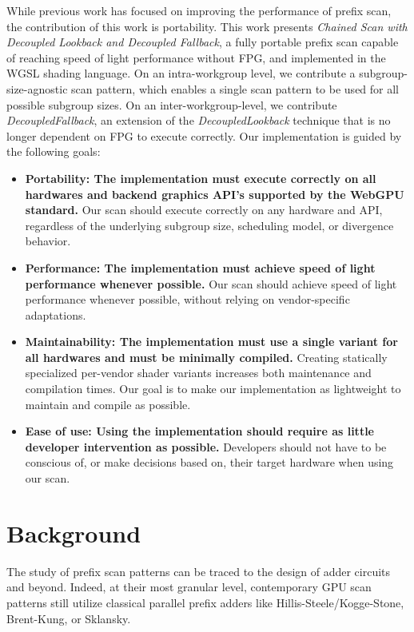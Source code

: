 \documentclass[sigconf]{acmart}
\begin{document}
While previous work has focused on improving the performance of prefix scan, the contribution of this work is portability. This work presents \textit{Chained Scan with Decoupled Lookback and Decoupled Fallback}, a fully portable prefix scan capable of reaching speed of light performance without FPG, and implemented in the WGSL shading language. On an intra-workgroup level, we contribute a subgroup-size-agnostic scan pattern, which enables a single scan pattern to be used for all possible subgroup sizes. On an inter-workgroup-level, we contribute \textit{DecoupledFallback}, an extension of the \textit{DecoupledLookback} technique that is no longer dependent on FPG to execute correctly. Our implementation is guided by the following goals:
\begin{itemize}
\item \textbf{Portability: The implementation must execute correctly on all hardwares and backend graphics API's supported by the WebGPU standard.} Our scan should execute correctly on any hardware and API, regardless of the underlying subgroup size, scheduling model, or divergence behavior. 
\item \textbf{Performance: The implementation must achieve speed of light performance whenever possible.} Our scan should achieve speed of light performance whenever possible, without relying on vendor-specific adaptations.
\item \textbf{Maintainability: The implementation must use a single variant for all hardwares and must be minimally compiled.} Creating statically specialized per-vendor shader variants increases both maintenance and compilation times. Our goal is to make our implementation as lightweight to maintain and compile as possible.
\item \textbf{Ease of use: Using the implementation should require as little developer intervention as possible.} Developers should not have to be conscious of, or make decisions based on, their target hardware when using our scan.
\end{itemize}

\section{Background}

The study of prefix scan patterns can be traced to the design of adder circuits and beyond\cite{10.1145/322217.322232, 5219801}. Indeed, at their most granular level, contemporary GPU scan patterns still utilize classical parallel prefix adders like Hillis-Steele/Kogge-Stone\cite{10.1145/7902.7903, 5009159}, Brent-Kung\cite{1675982}, or Sklansky\cite{5219822}.
\end{document}
